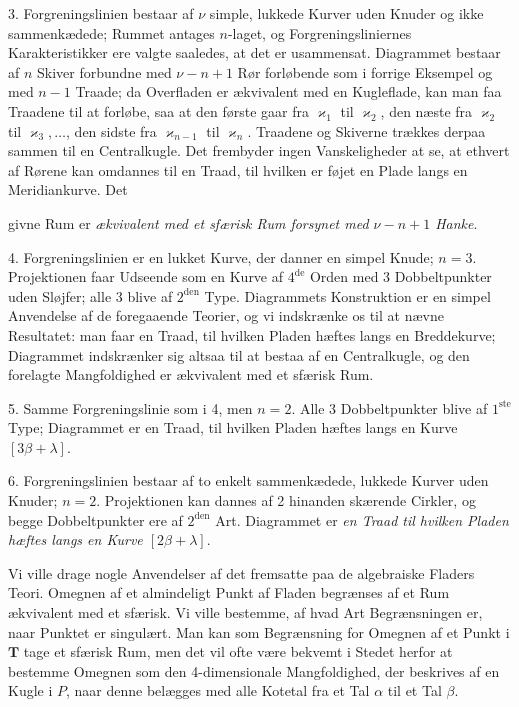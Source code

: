 \documentclass{article}
\begin{document}
3. Forgreningslinien bestaar af $\nu$ simple, lukkede Kurver uden Knuder og ikke sammenkædede; Rummet antages $n$-laget, og Forgreningsliniernes Karakteristikker ere valgte saaledes, at det er usammensat. Diagrammet bestaar af $n$ Skiver forbundne med $\nu - n + 1$ Rør forløbende som i forrige Eksempel og med $n - 1$ Traade; da Overfladen er ækvivalent med en Kugleflade, kan man faa Traadene til at forløbe, saa at den første gaar fra $\varkappa_1$ til $\varkappa_2$, den næste fra $\varkappa_2$ til $\varkappa_3, \dots$, den sidste fra $\varkappa_{n-1}$ til $\varkappa_n$. Traadene og Skiverne trækkes derpaa sammen til en Centralkugle. Det frembyder ingen Vanskeligheder at se, at ethvert af Rørene kan omdannes til en Traad, til hvilken er føjet en Plade langs en Meridiankurve. Det

givne Rum er \emph{ækvivalent med et sfærisk Rum forsynet med $\nu - n + 1$ Hanke}.

4. Forgreningslinien er en lukket Kurve, der danner en simpel Knude; $n = 3$. Projektionen faar Udseende som en Kurve af $4^{\text{de}}$ Orden med 3 Dobbeltpunkter uden Sløjfer; alle 3 blive af $2^{\text{den}}$ Type. Diagrammets Konstruktion er en simpel Anvendelse af de foregaaende Teorier, og vi indskrænke os til at nævne Resultatet: man faar en Traad, til hvilken Pladen hæftes langs en Breddekurve; Diagrammet indskrænker sig altsaa til at bestaa af en Centralkugle, og den forelagte Mangfoldighed er ækvivalent med et sfærisk Rum.

5. Samme Forgreningslinie som i 4, men $n = 2$. Alle 3 Dobbeltpunkter blive af $1^{\text{ste}}$ Type; Diagrammet er en Traad, til hvilken Pladen hæftes langs en Kurve $[3\beta + \lambda]$.

6. Forgreningslinien bestaar af to enkelt sammenkædede, lukkede Kurver uden Knuder; $n = 2$. Projektionen kan dannes af 2 hinanden skærende Cirkler, og begge Dobbeltpunkter ere af $2^{\text{den}}$ Art. Diagrammet er \emph{en Traad til hvilken Pladen hæftes langs en Kurve $[2\beta + \lambda]$}.

Vi ville drage nogle Anvendelser af det fremsatte paa de algebraiske Fladers Teori. Omegnen af et almindeligt Punkt af Fladen begrænses af et Rum ækvivalent med et sfærisk. Vi ville bestemme, af hvad Art Begrænsningen er, naar Punktet er singulært. Man kan som Begrænsning for Omegnen af et Punkt i $\mathbf{T}$ tage et sfærisk Rum, men det vil ofte være bekvemt i Stedet herfor at bestemme Omegnen som den 4-dimensionale Mangfoldighed, der beskrives af en Kugle i $P$, naar denne belægges med alle Kotetal fra et Tal $\alpha$ til et Tal $\beta$.
\end{document}

